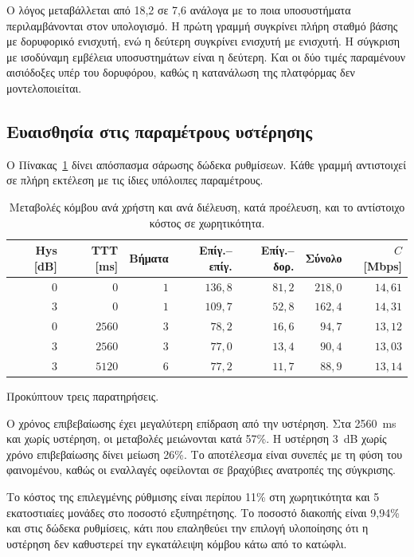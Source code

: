 \documentclass[11pt,a4paper]{article}
\begin{document}
Ο λόγος μεταβάλλεται από 18,2 σε 7,6 ανάλογα με το ποια υποσυστήματα
περιλαμβάνονται στον υπολογισμό. Η πρώτη γραμμή συγκρίνει πλήρη σταθμό βάσης με
δορυφορικό ενισχυτή, ενώ η δεύτερη συγκρίνει ενισχυτή με ενισχυτή. Η σύγκριση
με ισοδύναμη εμβέλεια υποσυστημάτων είναι η δεύτερη. Και οι δύο τιμές
παραμένουν αισιόδοξες υπέρ του δορυφόρου, καθώς η κατανάλωση της πλατφόρμας δεν
μοντελοποιείται.

\subsection{Ευαισθησία στις παραμέτρους υστέρησης}
\label{sec:sweep}

Ο Πίνακας~\ref{tab:sweep} δίνει απόσπασμα σάρωσης δώδεκα ρυθμίσεων. Κάθε γραμμή
αντιστοιχεί σε πλήρη εκτέλεση με τις ίδιες υπόλοιπες παραμέτρους.

\begin{table}[htbp]
\centering\small
\caption{Μεταβολές κόμβου ανά χρήστη και ανά διέλευση, κατά προέλευση, και το
αντίστοιχο κόστος σε χωρητικότητα.}
\label{tab:sweep}
\begin{tabular}{@{}rrrrrrr@{}}
\toprule
Hys [dB] & TTT [ms] & Βήματα & Επίγ.–επίγ. & Επίγ.–δορ. & Σύνολο & $C$ [Mbps] \\
\midrule
$0$ & $0$    & $1$ & $136{,}8$ & $81{,}2$ & $218{,}0$ & $14{,}61$ \\
$3$ & $0$    & $1$ & $109{,}7$ & $52{,}8$ & $162{,}4$ & $14{,}31$ \\
$0$ & $2560$ & $3$ & $78{,}2$  & $16{,}6$ & $94{,}7$  & $13{,}12$ \\
$3$ & $2560$ & $3$ & $77{,}0$  & $13{,}4$ & $90{,}4$  & $13{,}03$ \\
$3$ & $5120$ & $6$ & $77{,}2$  & $11{,}7$ & $88{,}9$  & $13{,}14$ \\
\bottomrule
\end{tabular}
\end{table}

Προκύπτουν τρεις παρατηρήσεις.

Ο χρόνος επιβεβαίωσης έχει μεγαλύτερη επίδραση από την υστέρηση. Στα 2560~ms
και χωρίς υστέρηση, οι μεταβολές μειώνονται κατά 57\%. Η υστέρηση 3~dB χωρίς
χρόνο επιβεβαίωσης δίνει μείωση 26\%. Το αποτέλεσμα είναι συνεπές με τη φύση
του φαινομένου, καθώς οι εναλλαγές οφείλονται σε βραχύβιες ανατροπές της
σύγκρισης.

Το κόστος της επιλεγμένης ρύθμισης είναι περίπου 11\% στη χωρητικότητα και
5 εκατοστιαίες μονάδες στο ποσοστό εξυπηρέτησης. Το ποσοστό διακοπής είναι
9,94\% και στις δώδεκα ρυθμίσεις, κάτι που επαληθεύει την επιλογή υλοποίησης
ότι η υστέρηση δεν καθυστερεί την εγκατάλειψη κόμβου κάτω από το κατώφλι.
\end{document}
